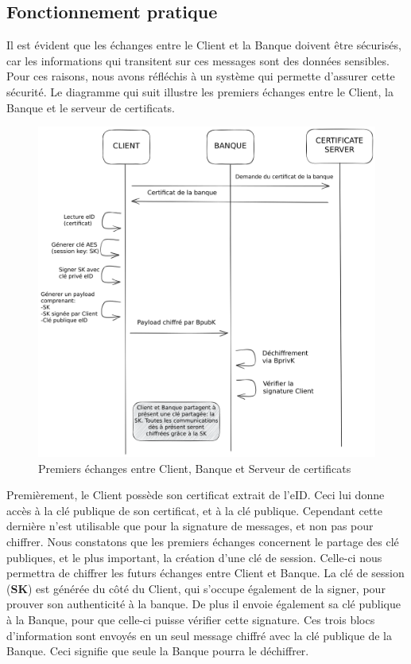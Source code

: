 \subsection{Fonctionnement pratique}

Il est évident que les échanges entre le Client et la Banque doivent être sécurisés, car les informations
qui transitent sur ces messages sont des données sensibles. Pour ces raisons, nous avons réfléchis à
un système qui permette d'assurer cette sécurité. Le diagramme qui suit illustre les premiers échanges
entre le Client, la Banque et le serveur de certificats.

\begin{figure}[H]
    \centering
    \includegraphics[width=\textwidth]{img/andrea-fig-1.png}
    \caption{Premiers échanges entre Client, Banque et Serveur de certificats}
    \label{fig:smartcard-exchange}
\end{figure}

Premièrement, le Client possède son certificat extrait de l'eID. Ceci lui donne accès à la clé publique
de son certificat, et à la clé publique. Cependant cette dernière n'est utilisable que pour la signature
de messages, et non pas pour chiffrer.
Nous constatons que les premiers échanges concernent le partage des clé publiques, et le plus
important, la création d'une clé de session. Celle-ci nous permettra de chiffrer les futurs échanges
entre Client et Banque. La clé de session (\textbf{SK}) est générée du côté du Client, qui s'occupe également de la signer, pour prouver son authenticité à la banque. De plus il envoie également sa clé publique à
la Banque, pour que celle-ci puisse vérifier cette signature. Ces trois blocs d'information sont envoyés
en un seul message chiffré avec la clé publique de la Banque. Ceci signifie que seule la Banque pourra
le déchiffrer.

